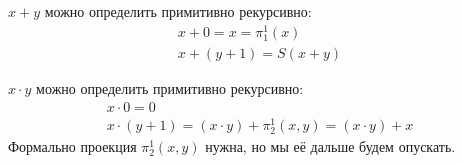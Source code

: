 \begin{exmp}
	$x+y$ можно определить примитивно рекурсивно:
	\begin{gather*}
	x+0=x=\pi_1^1(x) \\
	x+(y+1)=S(x+y)
	\end{gather*}
\end{exmp}
\begin{exmp}
	$x \cdot y$ можно определить примитивно рекурсивно:
	\begin{gather*}
	x\cdot 0=0 \\
	x\cdot(y+1)=(x\cdot y) + \pi_2^1(x, y) = (x\cdot y) + x
	\end{gather*}
	Формально проекция $\pi_2^1(x, y)$ нужна, но мы её дальше будем опускать.
\end{exmp}
